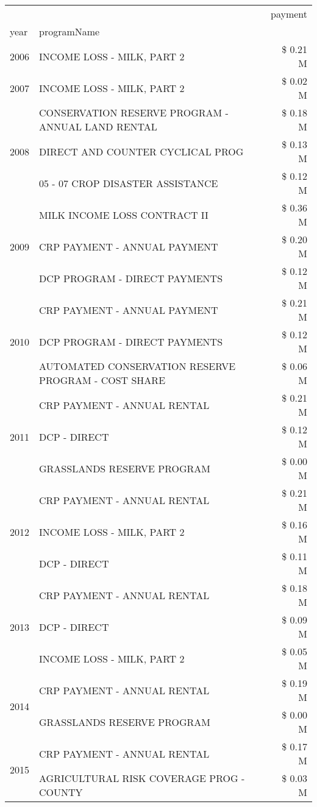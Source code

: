 \begin{tabular}{llr}
\toprule
 &  & payment \\
year & programName &  \\
\midrule
2006 & INCOME LOSS - MILK, PART 2 & \$ 0.21 M \\
\cline{1-3}
2007 & INCOME LOSS - MILK, PART 2 & \$ 0.02 M \\
\cline{1-3}
\multirow[t]{3}{*}{2008} & CONSERVATION RESERVE PROGRAM - ANNUAL LAND RENTAL & \$ 0.18 M \\
 & DIRECT AND COUNTER CYCLICAL PROG & \$ 0.13 M \\
 & 05 - 07 CROP DISASTER ASSISTANCE & \$ 0.12 M \\
\cline{1-3}
\multirow[t]{3}{*}{2009} & MILK INCOME LOSS CONTRACT II & \$ 0.36 M \\
 & CRP PAYMENT - ANNUAL PAYMENT & \$ 0.20 M \\
 & DCP PROGRAM - DIRECT PAYMENTS & \$ 0.12 M \\
\cline{1-3}
\multirow[t]{3}{*}{2010} & CRP PAYMENT - ANNUAL PAYMENT & \$ 0.21 M \\
 & DCP PROGRAM - DIRECT PAYMENTS & \$ 0.12 M \\
 & AUTOMATED CONSERVATION RESERVE PROGRAM - COST SHARE & \$ 0.06 M \\
\cline{1-3}
\multirow[t]{3}{*}{2011} & CRP PAYMENT - ANNUAL RENTAL & \$ 0.21 M \\
 & DCP - DIRECT & \$ 0.12 M \\
 & GRASSLANDS RESERVE PROGRAM & \$ 0.00 M \\
\cline{1-3}
\multirow[t]{3}{*}{2012} & CRP PAYMENT - ANNUAL RENTAL & \$ 0.21 M \\
 & INCOME LOSS - MILK, PART 2 & \$ 0.16 M \\
 & DCP - DIRECT & \$ 0.11 M \\
\cline{1-3}
\multirow[t]{3}{*}{2013} & CRP PAYMENT - ANNUAL RENTAL & \$ 0.18 M \\
 & DCP - DIRECT & \$ 0.09 M \\
 & INCOME LOSS - MILK, PART 2 & \$ 0.05 M \\
\cline{1-3}
\multirow[t]{2}{*}{2014} & CRP PAYMENT - ANNUAL RENTAL & \$ 0.19 M \\
 & GRASSLANDS RESERVE PROGRAM & \$ 0.00 M \\
\cline{1-3}
\multirow[t]{2}{*}{2015} & CRP PAYMENT - ANNUAL RENTAL & \$ 0.17 M \\
 & AGRICULTURAL RISK COVERAGE PROG - COUNTY & \$ 0.03 M \\
\cline{1-3}

\end{tabular}
